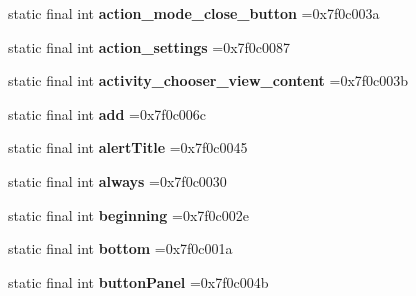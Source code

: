 \begin{DoxyCompactItemize}
\item 
\hypertarget{classcheck_1_1test_1_1_r_1_1id_aca45b800ebf690292fc70edab489511f}{}static final int {\bfseries action\+\_\+mode\+\_\+close\+\_\+button} =0x7f0c003a\label{classcheck_1_1test_1_1_r_1_1id_aca45b800ebf690292fc70edab489511f}

\item 
\hypertarget{classcheck_1_1test_1_1_r_1_1id_a108532f819897cfefff39e851aae73b0}{}static final int {\bfseries action\+\_\+settings} =0x7f0c0087\label{classcheck_1_1test_1_1_r_1_1id_a108532f819897cfefff39e851aae73b0}

\item 
\hypertarget{classcheck_1_1test_1_1_r_1_1id_a7118354a8560af163e8306e075346821}{}static final int {\bfseries activity\+\_\+chooser\+\_\+view\+\_\+content} =0x7f0c003b\label{classcheck_1_1test_1_1_r_1_1id_a7118354a8560af163e8306e075346821}

\item 
\hypertarget{classcheck_1_1test_1_1_r_1_1id_a81a58c18c61a2a167142c968c63dd938}{}static final int {\bfseries add} =0x7f0c006c\label{classcheck_1_1test_1_1_r_1_1id_a81a58c18c61a2a167142c968c63dd938}

\item 
\hypertarget{classcheck_1_1test_1_1_r_1_1id_aa5d68cdf9842bb79f45c642c403c710b}{}static final int {\bfseries alert\+Title} =0x7f0c0045\label{classcheck_1_1test_1_1_r_1_1id_aa5d68cdf9842bb79f45c642c403c710b}

\item 
\hypertarget{classcheck_1_1test_1_1_r_1_1id_a7deaef9bae4464ee7ad93ca96f69843c}{}static final int {\bfseries always} =0x7f0c0030\label{classcheck_1_1test_1_1_r_1_1id_a7deaef9bae4464ee7ad93ca96f69843c}

\item 
\hypertarget{classcheck_1_1test_1_1_r_1_1id_a027e82ef1ce6e706b36881b84d1acf5f}{}static final int {\bfseries beginning} =0x7f0c002e\label{classcheck_1_1test_1_1_r_1_1id_a027e82ef1ce6e706b36881b84d1acf5f}

\item 
\hypertarget{classcheck_1_1test_1_1_r_1_1id_ac0d6162dadf47d97b5d02be07c9885e8}{}static final int {\bfseries bottom} =0x7f0c001a\label{classcheck_1_1test_1_1_r_1_1id_ac0d6162dadf47d97b5d02be07c9885e8}

\item 
\hypertarget{classcheck_1_1test_1_1_r_1_1id_ac00ea1249f0e80403bacc8b0b3d77cdf}{}static final int {\bfseries button\+Panel} =0x7f0c004b\label{classcheck_1_1test_1_1_r_1_1id_ac00ea1249f0e80403bacc8b0b3d77cdf}


\end{DoxyCompactItemize}
